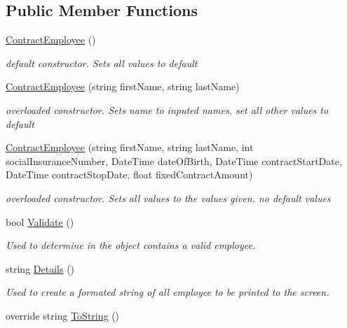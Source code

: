 \subsection*{Public Member Functions}
\begin{DoxyCompactItemize}
\item 
\hyperlink{class_all_employees_1_1_contract_employee_afb78892e913ff2a34aed4d7b78d6c9f7}{Contract\+Employee} ()
\begin{DoxyCompactList}\small\item\em default constructor. Sets all values to default \end{DoxyCompactList}\item 
\hyperlink{class_all_employees_1_1_contract_employee_ac7aa7412d0f08a2176da6e9fc0a1ddba}{Contract\+Employee} (string first\+Name, string last\+Name)
\begin{DoxyCompactList}\small\item\em overloaded constructor. Sets name to inputed names, set all other values to default \end{DoxyCompactList}\item 
\hyperlink{class_all_employees_1_1_contract_employee_ad5a58ffe16b3b193e6024219a6b10174}{Contract\+Employee} (string first\+Name, string last\+Name, int social\+Insurance\+Number, Date\+Time date\+Of\+Birth, Date\+Time contract\+Start\+Date, Date\+Time contract\+Stop\+Date, float fixed\+Contract\+Amount)
\begin{DoxyCompactList}\small\item\em overloaded constructor. Sets all values to the values given. no default values \end{DoxyCompactList}\item 
bool \hyperlink{class_all_employees_1_1_contract_employee_a826e3f824d86fb6b4cd1c527350c5b3a}{Validate} ()
\begin{DoxyCompactList}\small\item\em Used to determine in the object contains a valid employee. \end{DoxyCompactList}\item 
string \hyperlink{class_all_employees_1_1_contract_employee_adc3a5e1e3280ac1ec77d1a0767b95c19}{Details} ()
\begin{DoxyCompactList}\small\item\em Used to create a formated string of all employee to be printed to the screen. \end{DoxyCompactList}\item 
override string \hyperlink{class_all_employees_1_1_contract_employee_ae0ba5deffac9dcf5317c91fd7d7f8816}{To\+String} ()

\end{DoxyCompactItemize}
